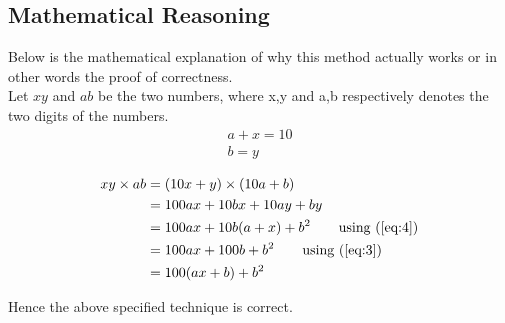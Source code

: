 \documentclass[]{article}
\begin{document}
\subsection{Mathematical Reasoning}
Below is the mathematical explanation of why this method actually works or in other words the proof of correctness.\\
Let $xy$ and $ab$ be the two numbers, where x,y and a,b respectively denotes the two digits of the numbers.
\begin{align}
a + x = 10 \label{eq:3}\\
b = y \label{eq:4}
\end{align}

\begin{align*} 
xy \times ab&=(10x+y) \times (10a+b) \\ 
&= 100ax + 10bx + 10ay + by\\
&= 100ax + 10b(a+x) + b^2 \tag*{using (\ref{eq:4})}\\
&= 100ax + 100b + b^2 \tag*{using (\ref{eq:3})}\\
&= 100(ax + b) + b^2
\end{align*}

Hence the above specified technique is correct.
\end{document}
